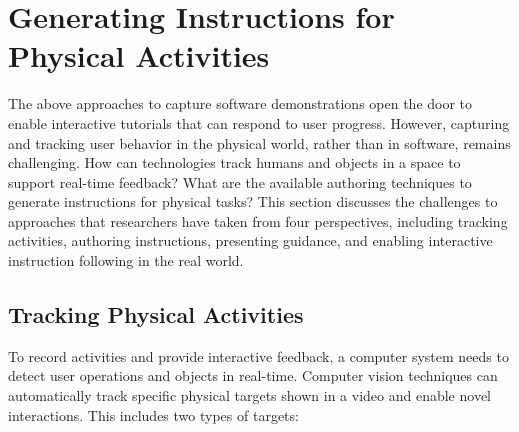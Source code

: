 



\section{Generating Instructions for Physical Activities}
\label{related_physical}

The above approaches to capture software demonstrations open the door to enable interactive tutorials that can respond to user progress. However, capturing and tracking user behavior in the physical world, rather than in software, remains challenging.
%
How can technologies track humans and objects in a space to support real-time feedback? What are the available authoring techniques to generate instructions for physical tasks?
%
This section discusses the challenges to approaches that researchers have taken from four perspectives, including tracking activities, authoring instructions, presenting guidance, and enabling interactive instruction following in the real world.


\subsection{Tracking Physical Activities}
To record activities and provide interactive feedback, a computer system needs to detect user operations and objects in real-time.
%
Computer vision techniques can automatically track specific physical targets shown in a video and enable novel interactions. This includes two types of targets:

